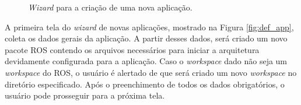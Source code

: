             \begin{figure}[htb]
                \centering
                \caption{\textit{Wizard} para a criação de uma nova aplicação.} \label{fig:new_app}
            \end{figure}
            
            A primeira tela do \textit{wizard} de novas aplicações, mostrado na Figura \ref{fig:def_app}, coleta os dados gerais da aplicação. A partir desses dados, será criado um novo pacote ROS contendo os arquivos necessários para iniciar a arquitetura devidamente configurada para a aplicação. Caso o \textit{workspace} dado não seja um \textit{workspace} do ROS, o usuário é alertado de que será criado um novo \textit{workspace} no diretório especificado. Após o preenchimento de todos os dados obrigatórios, o usuário pode prosseguir para a próxima tela.
            
